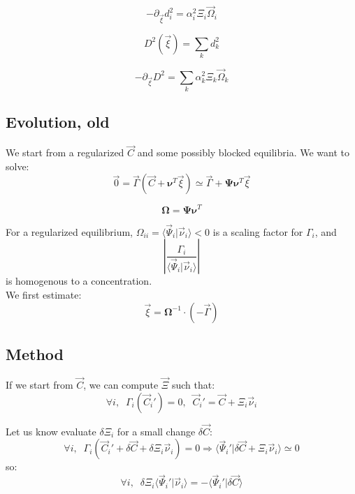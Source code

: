 \documentclass[aps,12pt]{revtex4}
\begin{document}
\begin{equation}
	-\partial_{\vec{\xi}} d_i^2 = \alpha_i^2 \Xi_i \vec{\Omega}_i
\end{equation}

\begin{equation}
	D^2(\vec{\xi}) = \sum_k d_k^2
\end{equation}  

\begin{equation}
	-\partial_{\vec{\xi}} D^2  = \sum_k \alpha_k^2 \Xi_k \vec{\Omega}_k
\end{equation}  


\subsection{Evolution, old}

We start from a regularized $\vec{C}$ and some possibly blocked equilibria. We 
want to solve:
\begin{equation}
	\vec{0} = 	\vec{\Gamma}(\vec{C}+\bm{\nu}^T \vec{\xi}) \simeq \vec{\Gamma} + \bm{\Psi} \bm{\nu}^T \vec{\xi}
\end{equation}

\begin{equation}
	\bm{\Omega} = \bm{\Psi} \bm{\nu}^T
\end{equation}	

For a regularized equilibrium, $\Omega_{ii}=\langle \vec{\Psi}_i \vert \vec{\nu}_i \rangle < 0$ is
a scaling factor for $\Gamma_i$, and
\begin{equation}
	\left\vert \dfrac{\Gamma_i}{\langle \vec{\Psi}_i \vert \vec{\nu}_i \rangle} \right\vert
\end{equation}
is homogenous to a concentration.\\
We first estimate:
\begin{equation}
	\vec{\xi} =  {\bm{\Omega}}^{-1} \cdot (-\vec{\Gamma} )
\end{equation}

\subsection{Method}

If we start from $\vec{C}$, we can compute $\vec{\Xi}$ such that:
\begin{equation}
	\forall i, \;\; \Gamma_i(\vec{C}_i') = 0, \;\; \vec{C}_i' = \vec{C} + \Xi_i \vec{\nu}_i
\end{equation}

Let us know evaluate $\delta\Xi_i$ for a small change $\delta\vec{C}$:
\begin{equation}
	\forall i, \;\;  \Gamma_i(\vec{C}_i' + \delta\vec{C} + \delta\Xi_i \vec{\nu}_i) = 0 \Rightarrow 
	\langle \vec{\Psi}_i' \vert \delta\vec{C} +   \Xi_i \vec{\nu}_i \rangle \simeq 0 
\end{equation}
so:
\begin{equation}
	\forall i, \;\; \delta\Xi_i \langle \vec{\Psi}_i' \vert \vec{\nu}_i \rangle
	 = -  \langle\vec{\Psi}_i' \vert \delta\vec{C} \rangle
\end{equation}
  	
\end{document}
